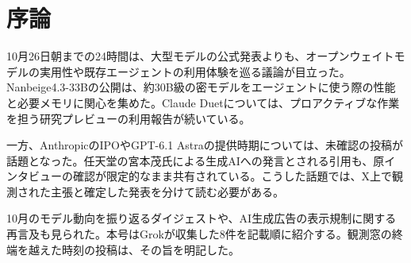 \section*{序論}
10月26日朝までの24時間は、大型モデルの公式発表よりも、オープンウェイトモデルの実用性や既存エージェントの利用体験を巡る議論が目立った。Nanbeige4.3-33Bの公開は、約30B級の密モデルをエージェントに使う際の性能と必要メモリに関心を集めた。Claude Duetについては、プロアクティブな作業を担う研究プレビューの利用報告が続いている。

一方、AnthropicのIPOやGPT-6.1 Astraの提供時期については、未確認の投稿が話題となった。任天堂の宮本茂氏による生成AIへの発言とされる引用も、原インタビューの確認が限定的なまま共有されている。こうした話題では、X上で観測された主張と確定した発表を分けて読む必要がある。

10月のモデル動向を振り返るダイジェストや、AI生成広告の表示規制に関する再言及も見られた。本号はGrokが収集した8件を記載順に紹介する。観測窓の終端を越えた時刻の投稿は、その旨を明記した。
